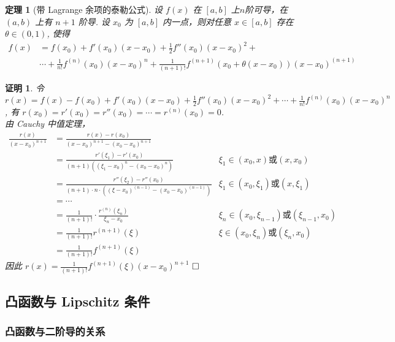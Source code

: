 \documentclass{ctexart}
\newcommand{\。}{．} %
\newenvironment{kuang3}{
    \begin{tcolorbox}[enhanced, breakable, colback=hlan!5!white, boxrule=0pt, frame hidden,
        borderline south={0.5mm}{0.1mm}{hlan}]
    }
    {\end{tcolorbox}}
\newenvironment{lanse}{
    \begin{tcolorbox}[enhanced, breakable, colback=qlan, boxrule=0pt, frame hidden,
        borderline west={0.7mm}{0.1mm}{slan}]
    }
    {\end{tcolorbox}}
\newenvironment{huangse}{
    \begin{tcolorbox}[enhanced, breakable, colback=qhuang, boxrule=0pt, frame hidden,
        borderline west={0.7mm}{0.1mm}{shuang}]
    }
    {\end{tcolorbox}}
\theoremstyle{t} %
\newtheorem{dlhj}{\color{shuang} 定理}[subsection]
\newtheorem*{zmhj}{\color{slan} 证明}
\newenvironment{zm}{\begin{lanse}\begin{zmhj}}{$\hfill \square$\end{zmhj}\end{lanse}}
\newenvironment{dl}{\begin{huangse}\begin{dlhj}}{\end{dlhj}\end{huangse}}
\begin{document}
\begin{dl}[带 Lagrange 余项的泰勒公式]
    设 $f(x)$ 在 $[a, b]$ 上$n$阶可导，在 $(a, b)$ 上有 $n + 1$ 阶导. 设 $x_0$ 为 $[a, b]$ 内一点，则对任意 $x \in [a, b]$ 存在 $\theta \in (0, 1)$, 使得
    \begin{align*}
        f(x) & = f(x_0) + f'(x_0)(x - x_0) + \frac{1}{2}f''(x_0)(x - x_0)^2 +  \\
        & \cdots + \frac{1}{n!}f^{(n)}(x_0)(x - x_0)^n + \frac{1}{(n + 1)!}f^{(n + 1)}(x_0 + \theta(x - x_0))(x - x_0)^{(n + 1)}
    \end{align*}
\end{dl}

\begin{zm}
    令 $r(x) = f(x) - f(x_0) + f'(x_0)(x - x_0) + \frac{1}{2}f''(x_0)(x - x_0)^2 + \cdots + \frac{1}{n!}f^{(n)}(x_0)(x - x_0)^n$, 有 $r(x_0) = r'(x_0) = r''(x_0) = \cdots = r^{(n)}(x_0) = 0$. \\
    由 Cauchy 中值定理，
    \begin{align*}
        \frac{r(x)}{(x - x_0)^{n + 1}} & = \frac{r(x) - r(x_0)}{(x - x_0)^{n + 1} - (x_0 - x_0)^{n + 1}} \\
        & = \frac{r'(\xi_1) - r'(x_0)}{(n + 1)((\xi_1 - x_0)^n - (x_0 - x_0)^n)} & \xi_1 \in (x_0, x) \text{或} (x, x_0) \\
        & =  \frac{r''(\xi_2) - r''(x_0)}{(n + 1)\cdot n\cdot ((\xi - x_0)^{(n - 1)} - (x_0 - x_0)^{(n - 1)})} & \xi_1 \in (x_0, \xi_1) \text{或} (x, \xi_1) \\
        & = \cdots \\
        & = \frac{1}{(n + 1)!}\cdot \frac{r^{(n)}(\xi_n)}{\xi_n - x_0} & \xi_n \in (x_0, \xi_{n - 1}) \text{或} (\xi_{n - 1}, x_0) \\
        & = \frac{1}{(n + 1)!}r^{(n + 1)}(\xi) & \xi \in (x_0, \xi_{n}) \text{或} (\xi_{n}, x_0) \\
        & = \frac{1}{(n + 1)!}f^{(n + 1)}(\xi)
    \end{align*}
    因此 $r(x) = \frac{1}{(n + 1)!}f^{(n + 1)}(\xi)(x - x_0)^{n + 1}$  
\end{zm}


\begin{kuang3}
    \subsection{凸函数与 Lipschitz 条件}
\end{kuang3}

\subsubsection{凸函数与二阶导的关系}
\end{document}
